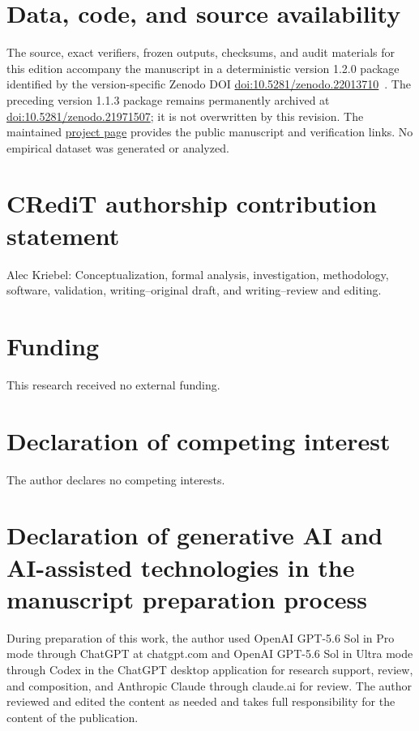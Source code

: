 \documentclass[11pt]{article}
\theoremstyle{remark}
\begin{document}
\section*{Data, code, and source availability}

The source, exact verifiers, frozen outputs, checksums, and audit materials for
this edition accompany the manuscript in a deterministic version 1.2.0
package identified by the version-specific Zenodo DOI
\href{https://doi.org/10.5281/zenodo.22013710}
{doi:10.5281/zenodo.22013710}~\cite{Kriebel2026Zenodo}.  The preceding version
1.1.3 package remains permanently archived at
\href{https://doi.org/10.5281/zenodo.21971507}
{doi:10.5281/zenodo.21971507}; it is not overwritten by this revision.  The
maintained \href{https://aleckriebel.github.io/Math/papers/exceptional-ybe-d4/}
{project page} provides the public manuscript and verification links.  No
empirical dataset was generated or analyzed.

\section*{CRediT authorship contribution statement}

Alec Kriebel: Conceptualization, formal analysis, investigation, methodology,
software, validation, writing--original draft, and writing--review and editing.

\section*{Funding}

This research received no external funding.

\section*{Declaration of competing interest}

The author declares no competing interests.

\section*{Declaration of generative AI and AI-assisted technologies in the
manuscript preparation process}

During preparation of this work, the author used OpenAI GPT-5.6 Sol in Pro
mode through ChatGPT at chatgpt.com and OpenAI GPT-5.6 Sol in Ultra mode
through Codex in the ChatGPT desktop application for research support, review,
and composition, and Anthropic Claude through claude.ai for review.  The
author reviewed and edited the content as needed and takes full responsibility
for the content of the publication.
\end{document}
